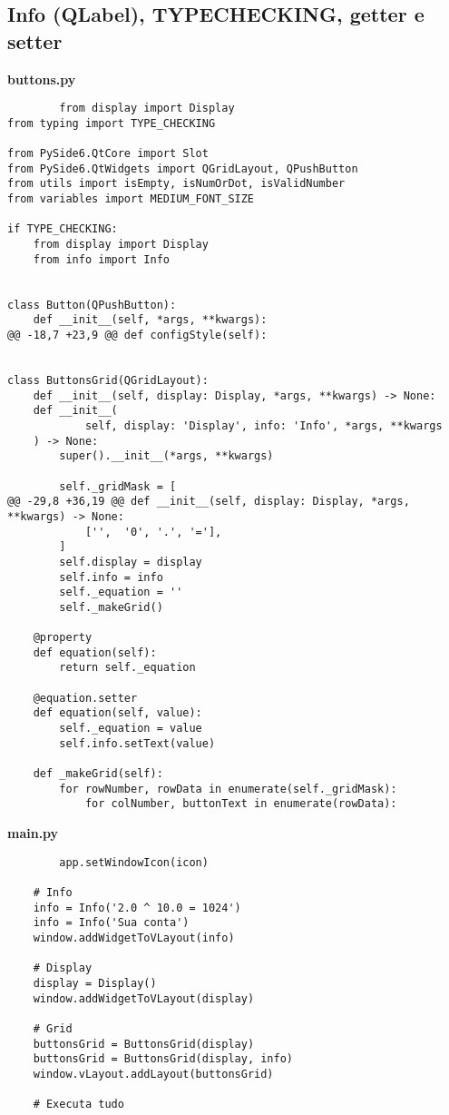 \documentclass[12pt,a4paper]{article}
\begin{document}
    \subsection{Info (QLabel), TYPECHECKING, getter e setter }
    \textbf{buttons.py}
    \begin{lstlisting}
        from display import Display
from typing import TYPE_CHECKING

from PySide6.QtCore import Slot
from PySide6.QtWidgets import QGridLayout, QPushButton
from utils import isEmpty, isNumOrDot, isValidNumber
from variables import MEDIUM_FONT_SIZE

if TYPE_CHECKING:
    from display import Display
    from info import Info


class Button(QPushButton):
    def __init__(self, *args, **kwargs):
@@ -18,7 +23,9 @@ def configStyle(self):


class ButtonsGrid(QGridLayout):
    def __init__(self, display: Display, *args, **kwargs) -> None:
    def __init__(
            self, display: 'Display', info: 'Info', *args, **kwargs
    ) -> None:
        super().__init__(*args, **kwargs)

        self._gridMask = [
@@ -29,8 +36,19 @@ def __init__(self, display: Display, *args, **kwargs) -> None:
            ['',  '0', '.', '='],
        ]
        self.display = display
        self.info = info
        self._equation = ''
        self._makeGrid()

    @property
    def equation(self):
        return self._equation

    @equation.setter
    def equation(self, value):
        self._equation = value
        self.info.setText(value)

    def _makeGrid(self):
        for rowNumber, rowData in enumerate(self._gridMask):
            for colNumber, buttonText in enumerate(rowData):
    \end{lstlisting}

    \textbf{main.py}
    \begin{lstlisting}
        app.setWindowIcon(icon)

    # Info
    info = Info('2.0 ^ 10.0 = 1024')
    info = Info('Sua conta')
    window.addWidgetToVLayout(info)

    # Display
    display = Display()
    window.addWidgetToVLayout(display)

    # Grid
    buttonsGrid = ButtonsGrid(display)
    buttonsGrid = ButtonsGrid(display, info)
    window.vLayout.addLayout(buttonsGrid)

    # Executa tudo
    \end{lstlisting}
\end{document}
